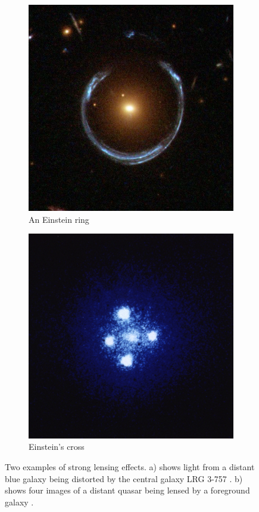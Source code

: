 \documentclass[a4paper,11pt]{article}
\begin{document}
\begin{figure}
\centering
\begin{subfigure}{0.4\textwidth}
\includegraphics[width=\textwidth]{einstein_ring}
\caption{An Einstein ring}
\label{fig:einring}
\end{subfigure}
\qquad
\begin{subfigure}{0.4\textwidth}
\includegraphics[width=\textwidth]{einstein_cross}
\caption{Einstein's cross}
\label{fig:einsteincross}
\end{subfigure}
\caption{Two examples of strong lensing effects. a) shows light from
a distant blue galaxy being distorted by the central galaxy LRG 3-757
\cite{einsteinring}. b) shows four images of a distant quasar being lensed by a
foreground galaxy \cite{eincross}.}
\label{fig:stronglens}
\end{figure}
\end{document}
